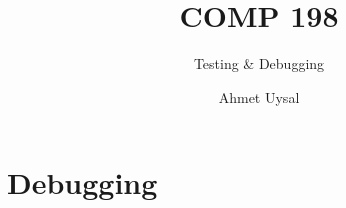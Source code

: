 

\usepackage{KU-Beamer-Template/style/koc} 
\usepackage{minted}

\title{COMP 198} 
\subtitle{Testing \& Debugging} 
\date{}
\author{Ahmet Uysal}




  \maketitle

  
  \section{Debugging}
  
